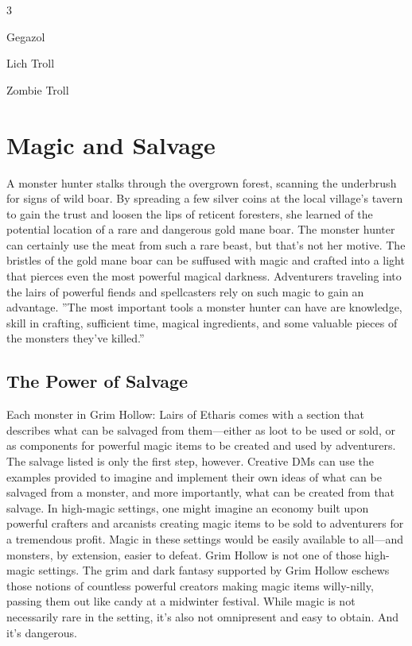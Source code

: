 \documentclass[10pt,a4paper,twoside,twocolumn,openany,bg=print,nodeprecatedcode]{dndbook}
\begin{document}
\begin{itemize}
\begin{multicols}{3}
\item Gegazol
\item Lich Troll
\item Zombie Troll
\end{multicols}

\end{itemize}

\appendix
\chapter{Magic and Salvage}
A monster hunter stalks through the overgrown forest, scanning the underbrush for signs of wild boar. By spreading a few silver coins at the local village's tavern to gain the trust and loosen the lips of reticent foresters, she learned of the potential location of a rare and dangerous gold mane boar.
The monster hunter can certainly use the meat from such a rare beast, but that's not her motive. The bristles of the gold mane boar can be suffused with magic and crafted into a light that pierces even the most powerful magical darkness. Adventurers traveling into the lairs of powerful fiends and spellcasters rely on such magic to gain an advantage.
\DndQuote%
{}
{''The most important tools a monster hunter can have are knowledge, skill in crafting, sufficient time, magical ingredients, and some valuable pieces of the monsters they've killed.''}
{}
\section{The Power of Salvage}
Each monster in Grim Hollow: Lairs of Etharis comes with a section that describes what can be salvaged from them—either as loot to be used or sold, or as components for powerful magic items to be created and used by adventurers. The salvage listed is only the first step, however. Creative DMs can use the examples provided to imagine and implement their own ideas of what can be salvaged from a monster, and more importantly, what can be created from that salvage.
In high-magic settings, one might imagine an economy built upon powerful crafters and arcanists creating magic items to be sold to adventurers for a tremendous profit. Magic in these settings would be easily available to all—and monsters, by extension, easier to defeat.
Grim Hollow is not one of those high-magic settings. The grim and dark fantasy supported by Grim Hollow eschews those notions of countless powerful creators making magic items willy-nilly, passing them out like candy at a midwinter festival. While magic is not necessarily rare in the setting, it's also not omnipresent and easy to obtain. And it's dangerous.
\end{document}
